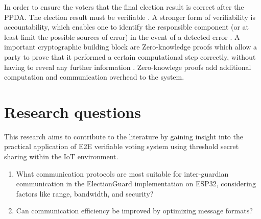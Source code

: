 In order to ensure the voters that the final election result is correct after the \ac{PPDA}. The election result must be verifiable \cite[4]{stuve-study}. A stronger form of verifiability is accountability, which enables one to identify the responsible component (or at least limit the possible sources of error) in the event of a detected error \cite[10. 27]{stuve-study}. A important cryptographic building block are Zero-knowledge proofs which allow a party to prove that it performed a certain computational step correctly, without having to reveal any further information \cite[13]{stuve-study}. Zero-knowlege proofs add additional computation and communication overhead to the system.



\begin{comment}

Traditional cryptographic algorithms encounter challenges
when applied to IoT scenarios due to inherent resource limitations
such as power constraints, limited battery capacity, and the need for
real-time execution \cite[1]{smpc}.


dentification of key methods: Based on an extensive market and literature analysis, we have
selected eight key methods for end-to-end verifiable online voting that we will study in more
detail in this work. These methods differ in their purposes, underlying assumptions and cryp
tographic building blocks
\cite[7]{stuve-study}


Since the voting devices use cryptographic techniques to keep the vot
ers’ individual choices secret, it is impossible for a human voter to directly check that their voting
device VD cast their vote as intended. There exist different techniques to empower voters to verify
that their original choices have been processed correctly. Some techniques employ, for example,
separate audit devices or applications, while others use human-readable codes.
\cite[11]{stuve-study}


while efficiency reflects the computational and communication
costs of running a voting system using that mechanism
\cite[31]{stuve-study}


\end{comment}






\section{Research questions}
This research aims to contribute to the literature by gaining insight into the practical application of \ac{E2E} verifiable voting system using threshold secret sharing within the \ac{IoT} environment.
\begin{enumerate}
    \item What communication protocols are most suitable for inter-guardian communication in the ElectionGuard implementation on ESP32, considering factors like range, bandwidth, and security?
    \item Can communication efficiency be improved by optimizing message formats?
\end{enumerate}

